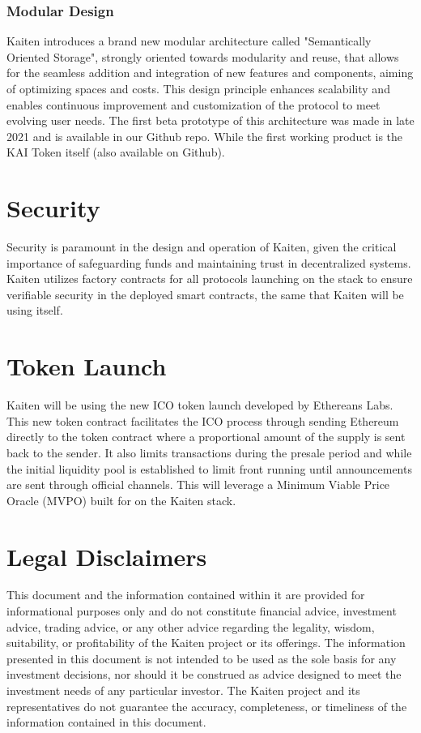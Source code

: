 \documentclass[11pt,oneside,a4paper]{article}
\begin{document}
\subsubsection{Modular Design}
Kaiten introduces a brand new modular architecture called "Semantically Oriented Storage", strongly oriented towards modularity and reuse, that allows for the seamless addition and integration of new features and components, aiming of optimizing spaces and costs. This design principle enhances scalability and enables continuous improvement and customization of the protocol to meet evolving user needs. The first beta prototype of this architecture was made in late 2021 and is available in our Github repo. While the first working product is the KAI Token itself (also available on Github).

\section{Security}

Security is paramount in the design and operation of Kaiten, given the critical importance of safeguarding funds and maintaining trust in decentralized systems. Kaiten utilizes factory contracts for all protocols launching on the stack to ensure verifiable security in the deployed smart contracts, the same that Kaiten will be using itself.

\section{Token Launch}

Kaiten will be using the new ICO token launch developed by Ethereans Labs. This new token contract facilitates the ICO process through sending Ethereum directly to the token contract where a proportional amount of the supply is sent back to the sender. It also limits transactions during the presale period and while the initial liquidity pool is established to limit front running until announcements are sent through official channels. This will leverage a Minimum Viable Price Oracle (MVPO) built for on the Kaiten stack.

\section{Legal Disclaimers}

This document and the information contained within it are provided for informational purposes only and do not constitute financial advice, investment advice, trading advice, or any other advice regarding the legality, wisdom, suitability, or profitability of the Kaiten project or its offerings. The information presented in this document is not intended to be used as the sole basis for any investment decisions, nor should it be construed as advice designed to meet the investment needs of any particular investor. The Kaiten project and its representatives do not guarantee the accuracy, completeness, or timeliness of the information contained in this document.
\end{document}

